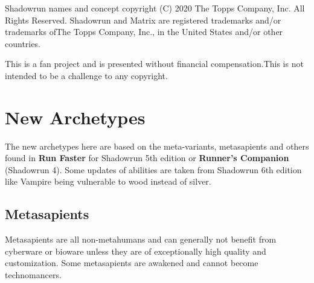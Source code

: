 \documentclass{book}
\begin{document}
\small Shadowrun names and concept copyright (C) 2020 The Topps Company, Inc. All Rights Reserved. Shadowrun and Matrix are registered trademarks and/or trademarks ofThe Topps Company, Inc., in the United States and/or other countries.

\small This is a fan project and is presented without financial compensation.This is not intended to be a challenge to any
copyright.
\newpage
\begin{multicols}{2}
\tableofcontents
\end{multicols}

\chapter{New Archetypes}
The new archetypes here are based on the meta-variants, metasapients and others found in \textbf{Run Faster} for Shadowrun 5th edition or \textbf{Runner's Companion} (Shadowrun 4). Some updates of abilities are taken from Shadowrun 6th edition like Vampire being vulnerable to wood instead of silver.

\section{Metasapients}
\label{sec:metasapients}
Metasapients are all non-metahumans and can generally not benefit from cyberware or bioware unless they are of exceptionally high quality and customization. Some metasapients are awakened and cannot become technomancers.
\end{document}

